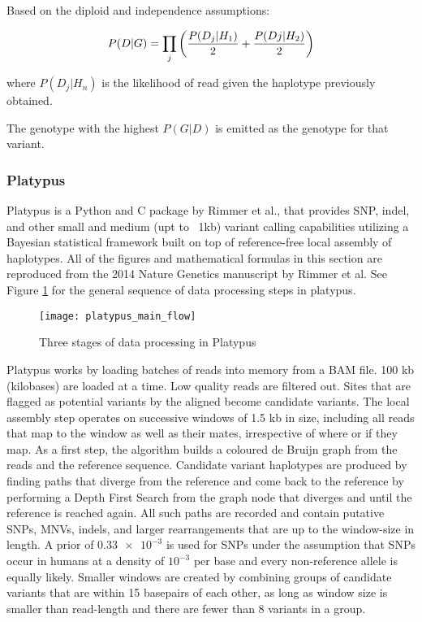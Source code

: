 Based on the diploid and independence assumptions:

\begin{equation}
    \label{eq:gatk_genotype_likelihood}
    P(D|G) = \prod_j{\bigg({P(D_j|H_1)\over 2} + {P(Dj|H_2)\over 2}\bigg)}
\end{equation}

where $P(D_j|H_n)$ is the likelihood of read given the haplotype previously obtained.

The genotype with the highest $P(G|D)$ is emitted as the genotype for that variant.

\subsubsection{Platypus}
Platypus\autocite{rimmer2014integrating} is a Python and C package by Rimmer et al., that provides SNP, indel, and other small and medium (upt to ~1kb) variant calling capabilities utilizing a Bayesian statistical framework built on top of reference-free local assembly of haplotypes. All of the figures and mathematical formulas in this section are reproduced from the 2014 Nature Genetics manuscript by Rimmer et al. See Figure \ref{fig:platypus_main_flow} for the general sequence of data processing steps in platypus.

\begin{figure}[H]
    \texttt{[image: platypus\_main\_flow]}
    \centering
    \caption {Three stages of data processing in Platypus\autocite{rimmer2014integrating}}
    \label{fig:platypus_main_flow}
    \end{figure}


Platypus works by loading batches of reads into memory from a BAM file. 100 kb (kilobases) are loaded at a time. Low quality reads are filtered out. Sites that are flagged as potential variants by the aligned become candidate variants. The local assembly step operates on successive windows of 1.5 kb in size, including all reads that map to the window as well as their mates, irrespective of where or if they map. As a first step, the algorithm builds a coloured de Bruijn graph\autocite{iqbal2012novo} from the reads and the reference sequence. Candidate variant haplotypes are produced by finding paths that diverge from the reference and come back to the reference by performing a Depth First Search from the graph node that diverges and until the reference is reached again. All such paths are recorded and contain putative SNPs, MNVs, indels, and larger rearrangements that are up to the window-size in length. A prior of $\num{0.33e-3}$ is used for SNPs under the assumption that SNPs occur in humans at a density of $10^{-3}$ per base and every non-reference allele is equally likely. Smaller windows are created by combining groups of candidate variants that are within 15 basepairs of each other, as long as window size is smaller than read-length and there are fewer than 8 variants in a group.

